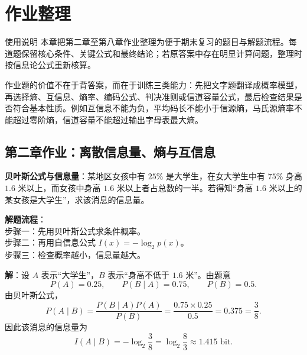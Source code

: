 \section{作业整理}

\begin{remarkBox}{使用说明}
本章把第二章至第八章作业整理为便于期末复习的题目与解题流程。每道题保留核心条件、关键公式和最终结论；若原答案中存在明显计算问题，整理时按信息论公式重新核算。
\end{remarkBox}

作业题的价值不在于背答案，而在于训练三类能力：先把文字题翻译成概率模型，再选择熵、互信息、熵率、编码公式、判决准则或信道容量公式，最后检查结果是否符合基本性质。例如互信息不能为负，平均码长不能小于信源熵，马氏源熵率不能超过零阶熵，信道容量不能超过输出字母表最大熵。

\subsection{第二章作业：离散信息量、熵与互信息}

\begin{example}
\label{hw:ch2-bayes-information}
\textbf{贝叶斯公式与信息量}：某地区女孩中有 $25\%$ 是大学生，在女大学生中有 $75\%$ 身高 $1.6$ 米以上，而女孩中身高 $1.6$ 米以上者占总数的一半。若得知“身高 $1.6$ 米以上的某女孩是大学生”，求该消息的信息量。

\noindent \textbf{解题流程}：\\[2pt]
步骤一：先用贝叶斯公式求条件概率。\\
步骤二：再用自信息公式 $I(x)=-\log_2p(x)$。\\
步骤三：检查概率越小，信息量越大。

\textbf{解}：设 $A$ 表示“大学生”，$B$ 表示“身高不低于 $1.6$ 米”。由题意
\[
P(A)=0.25,
\qquad
P(B\mid A)=0.75,
\qquad
P(B)=0.5.
\]
由贝叶斯公式，
\[
P(A\mid B)=\frac{P(B\mid A)P(A)}{P(B)}
=\frac{0.75\times0.25}{0.5}=0.375=\frac38.
\]
因此该消息的信息量为
\[
I(A\mid B)=-\log_2\frac38
=\log_2\frac83
\approx1.415\text{ bit}.
\]
\end{example}

